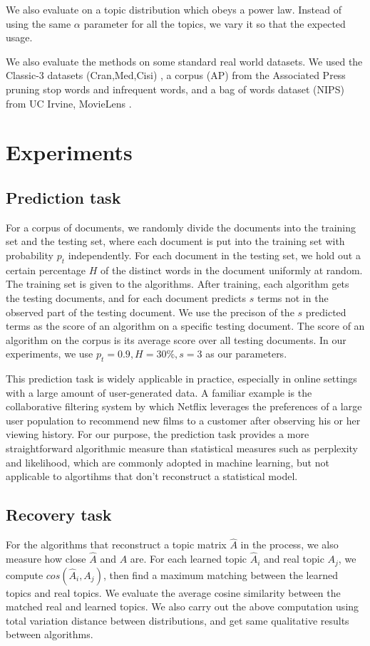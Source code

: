 \documentclass{sig-alternate}
\begin{document}
We also evaluate on a topic distribution which obeys a power 
law.  Instead of using the same $\alpha$ parameter for all
the topics, we vary it so that the expected usage.

We also evaluate the methods on some standard real world datasets.  We
used the Classic-3 datasets (Cran,Med,Cisi) \cite{Classic3}, a corpus
(AP) from the Associated Press \cite{AP} pruning stop words and
infrequent words, and a bag of words dataset (NIPS) from UC
Irvine\cite{KosNIPS}, MovieLens \cite{MovieLens}.

\section{Experiments}
\subsection{Prediction task}

For a corpus of documents, we randomly divide the documents into the
training set and the testing set, where each document is put into the
training set with probability $p_t$ independently. For each document
in the testing set, we hold out a certain percentage $H$ of the
distinct words in the document uniformly at random. The training set
is given to the algorithms. After training, each algorithm gets the
testing documents, and for each document predicts $s$ terms not in the
observed part of the testing document. We use the precison of the $s$
predicted terms as the score of an algorithm on a specific testing
document. The score of an algorithm on the corpus is its average score
over all testing documents. In our experiments, we use $p_t=0.9,
H=30\%,s=3$ as our parameters.

This prediction task is widely applicable in practice, especially in
online settings with a large amount of user-generated data. A familiar
example is the collaborative filtering system by which Netflix
leverages the preferences of a large user population to recommend new
films to a customer after observing his or her viewing history. For
our purpose, the prediction task provides a more straightforward
algorithmic measure than statistical measures such as perplexity and
likelihood, which are commonly adopted in machine learning, but not
applicable to algortihms that don't reconstruct a statistical model.

\subsection{Recovery task}
For the algorithms that reconstruct a topic matrix $\hat{A}$ in the
process, we also measure how close $\hat{A}$ and $A$ are. For each
learned topic $\hat{A}_i$ and real topic $A_j$, we compute
$cos(\hat{A}_i,A_j)$, then find a maximum matching between the learned
topics and real topics. We evaluate the average cosine similarity
between the matched real and learned topics. We also carry out the
above computation using total variation distance between
distributions, and get same qualitative results between algorithms.
\end{document}
